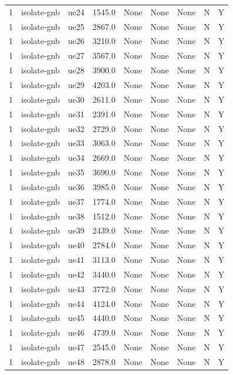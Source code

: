 \begin{table}[ht]
\begin{tabular}{|c|c|c|c|c|c|c|c|c|}
1 & isolate-gnb & ue24 & 1545.0 & None & None & None & N & Y \\
1 & isolate-gnb & ue25 & 2867.0 & None & None & None & N & Y \\
1 & isolate-gnb & ue26 & 3210.0 & None & None & None & N & Y \\
1 & isolate-gnb & ue27 & 3567.0 & None & None & None & N & Y \\
1 & isolate-gnb & ue28 & 3900.0 & None & None & None & N & Y \\
1 & isolate-gnb & ue29 & 4203.0 & None & None & None & N & Y \\
1 & isolate-gnb & ue30 & 2611.0 & None & None & None & N & Y \\
1 & isolate-gnb & ue31 & 2391.0 & None & None & None & N & Y \\
1 & isolate-gnb & ue32 & 2729.0 & None & None & None & N & Y \\
1 & isolate-gnb & ue33 & 3063.0 & None & None & None & N & Y \\
1 & isolate-gnb & ue34 & 2669.0 & None & None & None & N & Y \\
1 & isolate-gnb & ue35 & 3690.0 & None & None & None & N & Y \\
1 & isolate-gnb & ue36 & 3985.0 & None & None & None & N & Y \\
1 & isolate-gnb & ue37 & 1774.0 & None & None & None & N & Y \\
1 & isolate-gnb & ue38 & 1512.0 & None & None & None & N & Y \\
1 & isolate-gnb & ue39 & 2439.0 & None & None & None & N & Y \\
1 & isolate-gnb & ue40 & 2784.0 & None & None & None & N & Y \\
1 & isolate-gnb & ue41 & 3113.0 & None & None & None & N & Y \\
1 & isolate-gnb & ue42 & 3440.0 & None & None & None & N & Y \\
1 & isolate-gnb & ue43 & 3772.0 & None & None & None & N & Y \\
1 & isolate-gnb & ue44 & 4124.0 & None & None & None & N & Y \\
1 & isolate-gnb & ue45 & 4440.0 & None & None & None & N & Y \\
1 & isolate-gnb & ue46 & 4739.0 & None & None & None & N & Y \\
1 & isolate-gnb & ue47 & 2545.0 & None & None & None & N & Y \\
1 & isolate-gnb & ue48 & 2878.0 & None & None & None & N & Y \\

\end{tabular}
\end{table}
